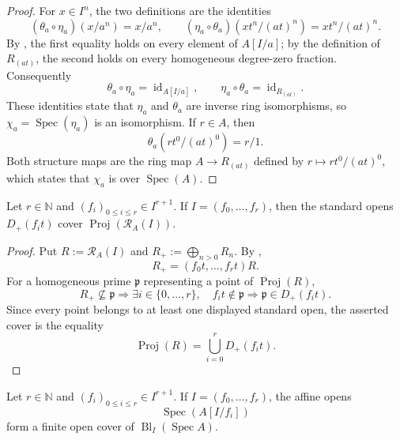 \begin{proof}
  For $x\in I^n$, the two definitions are the identities
  \[
    (\theta_a\circ\eta_a)(x/a^n)=x/a^n,
    \qquad
    (\eta_a\circ\theta_a)(xt^n/(at)^n)=xt^n/(at)^n.
  \]
  By , the first equality holds on
  every element of $A[I/a]$; by the definition of $R_{(at)}$, the second
  holds on every homogeneous degree-zero fraction.  Consequently
  \[
    \theta_a\circ\eta_a=\operatorname{id}_{A[I/a]},
    \qquad
    \eta_a\circ\theta_a=\operatorname{id}_{R_{(at)}}.
  \]
  These identities state that $\eta_a$ and $\theta_a$ are inverse ring
  isomorphisms, so $\chi_a=\operatorname{Spec}(\eta_a)$ is an isomorphism.
  If $r\in A$, then
  \[
    \theta_a(rt^0/(at)^0)=r/1.
  \]
  Both structure maps are the ring map $A\to R_{(at)}$ defined by
  $r\mapsto rt^0/(at)^0$, which states that $\chi_a$ is over
  $\operatorname{Spec}(A)$.
\end{proof}

\begin{lemma}
  \label{lemma:nagata-rees-generators-cover-proj}
  \lean{}

  Let $r\in\mathbb N$ and $(f_i)_{0\leq i\leq r}\in I^{r+1}$.  If
  $I=(f_0,\ldots,f_r)$, then the standard opens
  $D_+(f_it)$ cover $\operatorname{Proj}(\mathcal R_A(I))$.
\end{lemma}

\begin{proof}
  Put $R:=\mathcal R_A(I)$ and
  $R_+:=\bigoplus_{n>0}R_n$.  By
  ,
  \[
    R_+=(f_0t,\ldots,f_rt)R.
  \]
  For a homogeneous prime $\mathfrak p$ representing a point of
  $\operatorname{Proj}(R)$,
  \[
    R_+\nsubseteq\mathfrak p
      \Longrightarrow
      \exists i\in\{0,\ldots,r\},\quad f_it\notin\mathfrak p
      \Longrightarrow
      \mathfrak p\in D_+(f_it).
  \]
  Since every point belongs to at least one displayed standard open, the
  asserted cover is the equality
  \[
    \operatorname{Proj}(R)=\bigcup_{i=0}^rD_+(f_it).
  \]
\end{proof}

\begin{proposition}
  \label{prop:nagata-affine-blowup-chart-cover}
  \lean{}

  Let $r\in\mathbb N$ and $(f_i)_{0\leq i\leq r}\in I^{r+1}$.  If
  $I=(f_0,\ldots,f_r)$, the affine opens
  \[
    \operatorname{Spec}(A[I/f_i])
  \]
  form a finite open cover of
  $\operatorname{Bl}_I(\operatorname{Spec}A)$.
\end{proposition}


